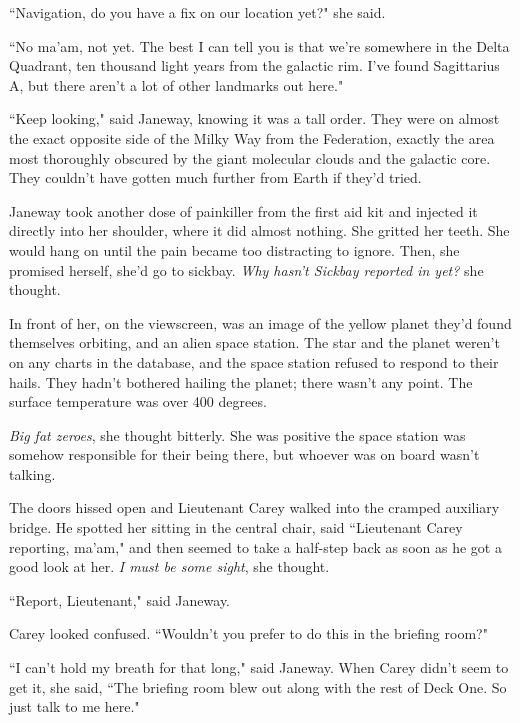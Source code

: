 \documentclass[twoside,letterpaper,12pt]{memoir}
\begin{document}
``Navigation, do you have a fix on our location yet?" she said.

``No ma'am, not yet. The best I can tell you is that we're somewhere in the Delta Quadrant, ten thousand light years from the galactic rim. I've found Sagittarius A, but there aren't a lot of other landmarks out here."

``Keep looking," said Janeway, knowing it was a tall order. They were on almost the exact opposite side of the Milky Way from the Federation, exactly the area most thoroughly obscured by the giant molecular clouds and the galactic core. They couldn't have gotten much further from Earth if they'd tried.

Janeway took another dose of painkiller from the first aid kit and injected it directly into her shoulder, where it did almost nothing. She gritted her teeth. She would hang on until the pain became too distracting to ignore. Then, she promised herself, she'd go to sickbay. \textit{Why hasn't Sickbay reported in yet?} she thought.

In front of her, on the viewscreen, was an image of the yellow planet they'd found themselves orbiting, and an alien space station. The star and the planet weren't on any charts in the database, and the space station refused to respond to their hails. They hadn't bothered hailing the planet; there wasn't any point. The surface temperature was over 400 degrees.

\textit{Big fat zeroes}, she thought bitterly. She was positive the space station was somehow responsible for their being there, but whoever was on board wasn't talking.

The doors hissed open and Lieutenant Carey walked into the cramped auxiliary bridge. He spotted her sitting in the central chair, said ``Lieutenant Carey reporting, ma'am," and then seemed to take a half-step back as soon as he got a good look at her. \textit{I must be some sight}, she thought.

``Report, Lieutenant," said Janeway.

Carey looked confused. ``Wouldn't you prefer to do this in the briefing room?"

``I can't hold my breath for that long," said Janeway. When Carey didn't seem to get it, she said, ``The briefing room blew out along with the rest of Deck One. So just talk to me here."
\end{document}
